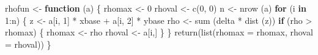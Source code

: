 \documentclass[
  12pt,
  letterpaper,
  DIV=11,
  numbers=noendperiod]{scrreprt}
\newenvironment{Shaded}{\begin{snugshade}}{\end{snugshade}}
\newcommand{\AttributeTok}[1]{\textcolor[rgb]{0.40,0.45,0.13}{#1}}
\newcommand{\ControlFlowTok}[1]{\textcolor[rgb]{0.00,0.23,0.31}{\textbf{#1}}}
\newcommand{\DecValTok}[1]{\textcolor[rgb]{0.68,0.00,0.00}{#1}}
\newcommand{\FunctionTok}[1]{\textcolor[rgb]{0.28,0.35,0.67}{#1}}
\newcommand{\NormalTok}[1]{\textcolor[rgb]{0.00,0.23,0.31}{#1}}
\newcommand{\OtherTok}[1]{\textcolor[rgb]{0.00,0.23,0.31}{#1}}
\newcommand{\SpecialCharTok}[1]{\textcolor[rgb]{0.37,0.37,0.37}{#1}}
\theoremstyle{remark}
\begin{document}
\begin{Shaded}
\begin{Highlighting}[]
\NormalTok{rhofun }\OtherTok{\textless{}{-}} \ControlFlowTok{function}\NormalTok{ (a) \{}
\NormalTok{  rhomax }\OtherTok{\textless{}{-}} \DecValTok{0}
\NormalTok{  rhoval }\OtherTok{\textless{}{-}} \FunctionTok{c}\NormalTok{(}\DecValTok{0}\NormalTok{, }\DecValTok{0}\NormalTok{)}
\NormalTok{  n }\OtherTok{\textless{}{-}} \FunctionTok{nrow}\NormalTok{ (a)}
  \ControlFlowTok{for}\NormalTok{ (i }\ControlFlowTok{in} \DecValTok{1}\SpecialCharTok{:}\NormalTok{n) \{}
\NormalTok{    z }\OtherTok{\textless{}{-}}\NormalTok{ a[i, }\DecValTok{1}\NormalTok{] }\SpecialCharTok{*}\NormalTok{ xbase }\SpecialCharTok{+}\NormalTok{ a[i, }\DecValTok{2}\NormalTok{] }\SpecialCharTok{*}\NormalTok{ ybase}
\NormalTok{    rho }\OtherTok{\textless{}{-}} \FunctionTok{sum}\NormalTok{ (delta }\SpecialCharTok{*} \FunctionTok{dist}\NormalTok{ (z))}
    \ControlFlowTok{if}\NormalTok{ (rho }\SpecialCharTok{\textgreater{}}\NormalTok{ rhomax) \{}
\NormalTok{      rhomax }\OtherTok{\textless{}{-}}\NormalTok{ rho}
\NormalTok{      rhoval }\OtherTok{\textless{}{-}}\NormalTok{ a[i,]}
\NormalTok{    \}}
\NormalTok{  \}}
  \FunctionTok{return}\NormalTok{(}\FunctionTok{list}\NormalTok{(}\AttributeTok{rhomax =}\NormalTok{ rhomax, }\AttributeTok{rhoval =}\NormalTok{ rhoval))}
\NormalTok{\}}


\end{Highlighting}
\end{Shaded}
\end{document}
